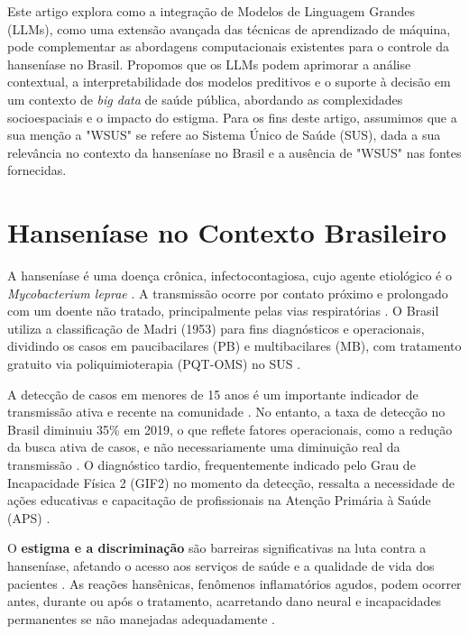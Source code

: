 \documentclass{article}
\begin{document}
Este artigo explora como a integração de Modelos de Linguagem Grandes (LLMs), como uma extensão avançada das técnicas de aprendizado de máquina, pode complementar as abordagens computacionais existentes para o controle da hanseníase no Brasil. Propomos que os LLMs podem aprimorar a análise contextual, a interpretabilidade dos modelos preditivos e o suporte à decisão em um contexto de \textit{big data} de saúde pública, abordando as complexidades socioespaciais e o impacto do estigma. Para os fins deste artigo, assumimos que a sua menção a "WSUS" se refere ao Sistema Único de Saúde (SUS), dada a sua relevância no contexto da hanseníase no Brasil e a ausência de "WSUS" nas fontes fornecidas.

\section{Hanseníase no Contexto Brasileiro}
A hanseníase é uma doença crônica, infectocontagiosa, cujo agente etiológico é o \textit{Mycobacterium leprae} \cite{brasil2022pcdt}. A transmissão ocorre por contato próximo e prolongado com um doente não tratado, principalmente pelas vias respiratórias \cite{brasil2017guia, brasil2022pcdt}. O Brasil utiliza a classificação de Madri (1953) para fins diagnósticos e operacionais, dividindo os casos em paucibacilares (PB) e multibacilares (MB), com tratamento gratuito via poliquimioterapia (PQT-OMS) no SUS \cite{brasil2017guia, brasil2022pcdt}.

A detecção de casos em menores de 15 anos é um importante indicador de transmissão ativa e recente na comunidade \cite{brasil2017guia, brasil2022pcdt, inovacao_computacional_hanseniase}. No entanto, a taxa de detecção no Brasil diminuiu 35\% em 2019, o que reflete fatores operacionais, como a redução da busca ativa de casos, e não necessariamente uma diminuição real da transmissão \cite{brasil2022pcdt, inovacao_computacional_hanseniase}. O diagnóstico tardio, frequentemente indicado pelo Grau de Incapacidade Física 2 (GIF2) no momento da detecção, ressalta a necessidade de ações educativas e capacitação de profissionais na Atenção Primária à Saúde (APS) \cite{brasil2017guia, brasil2022pcdt, inovacao_computacional_hanseniase}.

O \textbf{estigma e a discriminação} são barreiras significativas na luta contra a hanseníase, afetando o acesso aos serviços de saúde e a qualidade de vida dos pacientes \cite{brasil2017guia, brasil2022pcdt, inovacao_computacional_hanseniase}. As reações hansênicas, fenômenos inflamatórios agudos, podem ocorrer antes, durante ou após o tratamento, acarretando dano neural e incapacidades permanentes se não manejadas adequadamente \cite{brasil2017guia, brasil2022pcdt}.
\end{document}
